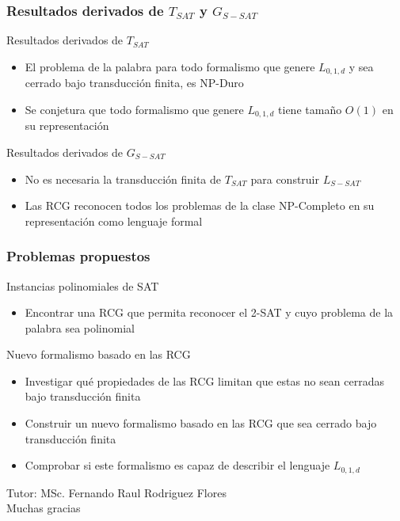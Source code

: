 \documentclass{beamer}
\newcommand{\tutor}{MSc. Fernando Raul Rodriguez Flores} %
\begin{document}
\begin{frame}
    \frametitle{Resultados derivados de $T_{SAT}$ y $G_{S-SAT}$}

    Resultados derivados de $T_{SAT}$
    \begin{itemize}
        \item El problema de la palabra para todo formalismo que genere $L_{0,1,d}$ y sea cerrado bajo transducción finita, es NP-Duro
        \item Se conjetura que todo formalismo que genere $L_{0,1,d}$ tiene tamaño $O(1)$ en su representación
    \end{itemize}
    \vspace{0.5cm}
    Resultados derivados de $G_{S-SAT}$
    \begin{itemize}
        \item No es necesaria la transducción finita de $T_{SAT}$ para construir $L_{S-SAT}$
        \item Las RCG reconocen todos los problemas de la clase NP-Completo en su representación como lenguaje formal
    \end{itemize}
\end{frame}

\begin{frame}
    \frametitle{Problemas propuestos}

    Instancias polinomiales de SAT
    \begin{itemize}
        \item Encontrar una RCG que permita reconocer el 2-SAT y cuyo problema de la palabra sea polinomial

    \end{itemize}
    \vspace{0.5cm}
    Nuevo formalismo basado en las RCG
    \begin{itemize}
        \item Investigar qué propiedades de las RCG limitan que estas no sean cerradas bajo transducción finita
        \item Construir un nuevo formalismo basado en las RCG que sea cerrado bajo transducción finita
        \item Comprobar si este formalismo es capaz de describir el lenguaje $L_{0,1,d}$
    \end{itemize}
\end{frame}

\begin{frame}
    \titlepage
    \vspace{1cm} %
    \begin{center}
        Tutor: \tutor\\
        \vspace{1cm}
        {\LARGE Muchas gracias}
        \smallskip
    \end{center}
\end{frame}
\end{document}

